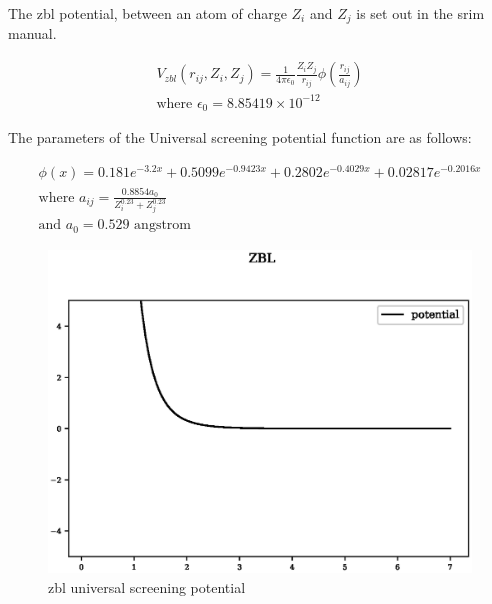 The \acrlong{zbl} potential, between an atom of charge $Z_i$ and $Z_j$ is set out in the \acrshort{srim} manual\cite{srimbook}.


\begin{equation}
\begin{split}
V_{zbl}(r_{ij}, Z_i, Z_j) = \frac{1}{4 \pi \epsilon_0} \frac{Z_i Z_j}{r_{ij}} \phi \left( \frac{r_{ij}}{a_{ij}} \right) \\
\text{where } \epsilon_0 = 8.85419\times 10^{-12} 
\end{split}
\label{eq:zblequation}
\end{equation}

The parameters of the Universal screening potential function are as follows:

\begin{equation}
\begin{split}
\phi(x) = 0.181 e^{-3.2x} + 0.5099 e^{-0.9423x} + 0.2802 e^{-0.4029x} + 0.02817 e^{-0.2016x} \\
\text{where } a_{ij} = \frac{0.8854 a_0}{Z^{0.23}_i + Z^{0.23}_j} \\
\text{and } a_0 = 0.529 \text{ angstrom}
\end{split}
\label{eq:screeningPotential}
\end{equation}


\begin{figure}[!htbp]
  \begin{center}
    \includegraphics[width=.5\linewidth]{chapters/background_potential_fitting/plots/zbl.eps}
    \caption{\acrshort{zbl} universal screening potential}
    \label{fig:zbluniversalscreening}
  \end{center}
\end{figure}


\FloatBarrier





